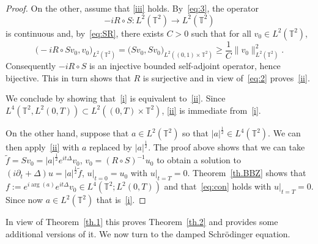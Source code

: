 \documentclass[10pt]{amsart}
\theoremstyle{definition}\newtheorem{defi}[theo]{Definition}\newtheorem{rema}[theo]{Remark}\newtheorem{exam}[theo]{Example}\newtheorem{exem}[theo]{Example}\newtheorem{nota}[theo]{Notation}
\newcommand{\TT}{{\mathbb T}}
\begin{document}
\begin{proof}
On the other, assume that {\eqref{iii}} holds. By~\eqref{eq:3}, the operator
\[
-i R \circ S : L^2(\TT^2) \rightarrow L^2(\TT^2)
\]
is continuous and,
by~\eqref{eq:SR}, there exists $ C > 0 $ such that for all $ v_0 \in L^2(\TT^2) $,
\[
\bigl(-i R \circ S v_0, v_0 \bigr) _{L^2(\TT^2)} = \bigl(Sv_0, S v_0\bigr)_{L^2((0,1) \times \TT^2) } \geq \frac 1 C \| v_0 \|_{L^2(\TT^2)}^2.
\]
Consequently $ -i R \circ S $ is an injective bounded self-adjoint operator, hence bijective. This in turn shows that $R$ is surjective and in view of~\eqref{eq:2} proves~\eqref{ii}.

We conclude by showing that~\eqref{i} is equivalent to~\eqref{ii}. Since $ L^4 (\TT^2, L^2 (0, T)) \subset L^2 ((0, T) \times
\TT^2)$, \eqref{ii} is immediate from~\eqref{i}.

On the other hand, suppose that $ a \in L^2 (\TT^2) $ so that $ |a|^{\frac12} \in L^4 (\TT^2) $. We can then apply~\eqref{ii} with $ a $ replaced by $ |a|^{\frac12 } $. The proof above shows that we can take $ \tilde f = Sv_0 = |a|^{\frac12} e^{it \Delta} v_0$, $ v_0 = (R \circ S)^{-1} u_0 $ to obtain a solution to $ (i \partial_t + \Delta) u = |a|^{\frac12} \tilde f $, $ u|_{t=0} = u_0 $ with $ u |_{t=T}=0 $. Theorem~\ref{th.BBZ} shows that $ f := e^{ i \arg(a)} e^{it \Delta} v_0 \in L^4(\TT^2; L^2(0,T)) $ and that~\eqref{eq:con} holds with $ u |_{t=T}=0 $. Since now $ a \in L^2 (\TT^2) $ that is~\eqref{i}.
\end{proof}

In view of Theorem~\ref{th.1} this proves Theorem~\ref{th.2} and provides some additional versions of it. We now turn to the damped Schrödinger equation.
\end{document}
